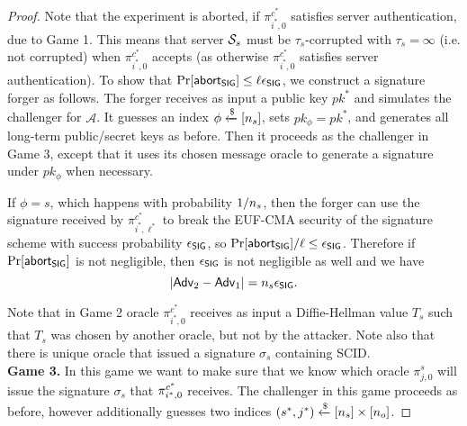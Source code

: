 \begin{proof}
 Note that the experiment is aborted, if $\pi^{c^{\ast}}_{i^{\ast},0}$ satisfies server authentication, due to Game 1. This means that server $\mathcal{S}_s$ must be $\tau_s$-corrupted with $\tau_s = \infty$ (i.e. not corrupted) when $\pi^{c^{\ast}}_{i^{\ast},0}$ accepts (as otherwise $\pi^{c^{\ast}}_{i^{\ast},0}$ satisfies server authentication). To show that $\Pr[\mathsf{abort}_{\mathsf{SIG}}] \leq \ell \epsilon_{\mathsf{SIG}}$, we construct a signature forger as follows. The forger receives as input a public key $pk^{\ast}$ and simulates the challenger for $\mathcal{A}$. It guesses an index $\phi \xleftarrow{\$}[n_s]$, sets $pk_{\phi} = pk^{\ast}$, and generates all long-term public/secret keys as before. Then it proceeds as the challenger in Game 3, except that it uses its chosen message oracle to generate a signature under $pk_{\phi}$ when necessary.

 If $\phi = s$, which happens with probability $1/n_s$, then the forger can use the signature received by $\pi^{c^{\ast}}_{i^{\ast},\ell^{\ast}}$ to break the EUF-CMA security of the signature scheme with success probability $\epsilon_{\mathsf{SIG}}$, so $\Pr[\mathsf{abort}_{\mathsf{SIG}}]/\ell \leq \epsilon_{\mathsf{SIG}}$. Therefore if $\Pr[\mathsf{abort}_{\mathsf{SIG}}]$ is not negligible, then $\epsilon_{\mathsf{SIG}}$ is not negligible as well and we have
 \begin{equation}
  |\mathsf{Adv}_2 - \mathsf{Adv}_1| = n_s \epsilon_{\mathsf{SIG}}.
 \end{equation}%

 Note that in Game 2 oracle $\pi^{c^{\ast}}_{i^{\ast},0}$ receives as input a Diffie-Hellman value $T_s$ such that $T_s$ was chosen by another oracle, but not by the attacker. Note also that there is unique oracle that issued a signature $\sigma_s$ containing SCID.
\vspace{10pt}\\%
%
%
 \textbf{Game 3.} In this game we want to make sure that we know which oracle $\pi^s_{j,0}$ will issue the signature $\sigma_s$ that $\pi^{c^{\ast}}_{i^{\ast},0}$ receives. The challenger in this game proceeds as before, however additionally guesses two indices $(s^{\ast}, j^{\ast}) \xleftarrow{\$} [n_s] \times [n_o]$.


\end{proof}
